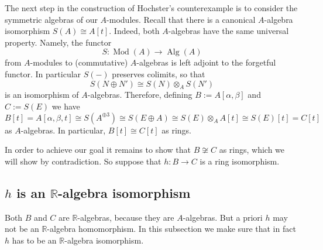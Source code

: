 \documentclass[A4paper, 12pt, british, reqno]{amsart}
\newcommand{\R}{\mathbb{R}} %
\theoremstyle{plain}
\theoremstyle{definition}
\theoremstyle{remark}
\theoremstyle{plain}
\theoremstyle{definition}
\theoremstyle{remark}
\theoremstyle{plain}
\theoremstyle{definition}
\theoremstyle{remark}
\newcommand{\ot}{\otimes}
\newcommand{\op}{\oplus}
\begin{document}
The next step in the construction of Hochster's counterexample is to consider the symmetric algebras of our $A$-modules.
Recall that there is a canonical $A$-algebra isomorphism $S(A)\cong A[t]$.
Indeed, both $A$-algebras have the same universal property.
Namely, the functor
\[ S\colon \operatorname{Mod}(A)\to \operatorname{Alg}(A) \]
from $A$-modules to (commutative) $A$-algebras is left adjoint to the forgetful functor.
In particular $S(-)$ preserves colimits, so that
\[ S(N\op N')\cong S(N)\ot_{A}S(N') \]
is an isomorphism of $A$-algebras.
Therefore, defining $B:=A[\alpha,\beta]$ and $C:=S(E)$ we have
\[ B[t]= A[\alpha,\beta,t]\cong S(A^{\op 3})\cong S(E\op A)\cong S(E)\ot_{A}A[t] \cong S(E)[t]=C[t] \]
as $A$-algebras.
In particular, $B[t]\cong C[t]$ as rings.

In order to achieve our goal it remains to show that $B\not\cong C$ as rings, which we will show by contradiction.
So suppose that $h\colon B\to C$ is a ring isomorphism.

\subsection{$h$ is an $\R$-algebra isomorphism}
Both $B$ and $C$ are $\R$-algebras, because they are $A$-algebras.
But a priori $h$ may not be an $\R$-algebra homomorphism.
In this subsection we make sure that in fact $h$ has to be an $\R$-algebra isomorphism.
\end{document}
